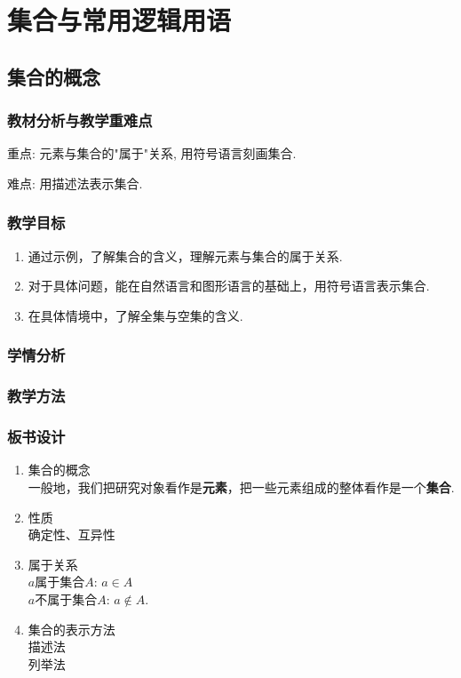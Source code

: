 \chapter{集合与常用逻辑用语}
\section{集合的概念}
\subsection{教材分析与教学重难点}
重点: 元素与集合的"属于"关系, 用符号语言刻画集合.

难点: 用描述法表示集合.
\subsection{教学目标}
\begin{enumerate}
	\item 通过示例，了解集合的含义，理解元素与集合的属于关系.
	\item 对于具体问题，能在自然语言和图形语言的基础上，用符号语言表示集合.
	\item 在具体情境中，了解全集与空集的含义.
\end{enumerate}
\subsection{学情分析}

\subsection{教学方法}

\subsection{板书设计}
\begin{boardenv}[集合的概念]
	\begin{enumerate}
		\item 集合的概念\\
		      一般地，我们把研究对象看作是\textbf{元素}，把一些元素组成的整体看作是一个\textbf{集合}.
		\item 性质\\
			  确定性、互异性
		\item 属于关系\\
		      $a$属于集合$A$: $a\in A$\\
		      $a$不属于集合$A$: $a\notin A$.
		\item 集合的表示方法\\
		      描述法\\
		      列举法
	\end{enumerate}
\end{boardenv}




